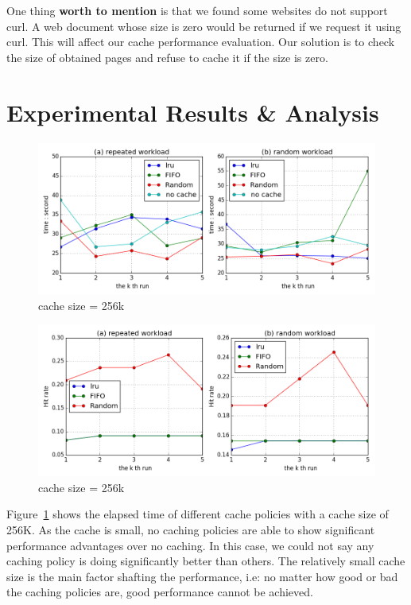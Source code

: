 \documentclass[paper=a4, fontsize=11pt]{scrartcl} %
\numberwithin{equation}{section} %
\numberwithin{figure}{section} %
\numberwithin{table}{section} %
\begin{document}
\vspace{0.5em}

One thing \textbf{worth to mention} is that we found some websites do not support curl. A web document whose size is zero would be returned if we request it using curl. This will affect our cache performance evaluation. Our solution is to check the size of obtained pages and refuse to cache it if the size is zero. 

\section{Experimental Results \& Analysis}

\begin{figure}[h]
  \centering
  \includegraphics[width=\textwidth]{../data/time256k}
  \caption{cache size = 256k}
  \label{fig:time256k}
\end{figure}
\begin{figure}[h]
  \centering
  \includegraphics[width=\textwidth]{../data/hit256k}
  \caption{cache size = 256k}
  \label{fig:hit256k}
\end{figure}

Figure~\ref{fig:time256k} shows the elapsed time of different cache policies with a cache size of 256K. As the cache is small, no caching policies are able to show significant performance advantages over no caching. In this case, we could not say any caching policy is doing significantly better than others. The relatively small cache size is the main factor shafting the performance, i.e: no matter how good or bad the caching policies are, good performance cannot be achieved.
\end{document}
